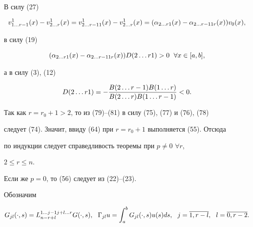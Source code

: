 \begin{pf}
\begin{equation}
\end{equation}





В силу (27)


\begin{equation}


v^1_{1\dotsc r-1}(x)-v^1_{2\dotsc r}(x)=


v^1_{2\dotsc r-1 1}(x)-v^1_{2\dotsc r}(x)=(\a_{2\dotsc r1}(x)-


\a_{2\dotsc r-11r}(x))v_0(x),


\end{equation}


в силу (19)


\begin{equation}


(\a_{2\dotsc r1}(x)-\a_{2\dotsc r-11r}(x))D(2\dotsc r1)>0\ \; 


\forall x\in\ab,


\end{equation}


а в силу (3), (12)


\begin{equation}


D(2\dotsc r1)=-\mf{B(2\dotsc r-1)B(1\dotsc r)}{B(2\dotsc r)B(1\dotsc r-1)}<0.


\end{equation}


Так как $r=r_0+1>2$, то из (79)--(81) в силу (75), (77) и (76), (78)


следует (74). Значит, ввиду (64) при $r=r_0+1$ выполняется (55). Отсюда


по индукции следует справедливость теоремы при $p\ne 0$ \; $\forall r$,


$2\le r\le n$.





Если же $p=0$, то (56) следует из (22)--(23).


\end{pf}





Обозначим


\begin{equation}


G_{jl}(\cdot,s)=L^{1\dotsc j-1j+l\dotsc r}_{n-r+l}G(\cdot,s),\ \ 


\Gamma_{jl}u=\int^b_a G_{jl}(\cdot,s)u(s)ds,


\ \ j=\o{1,r-l},\ \ l=\o{0,r-2}.


\end{equation}








